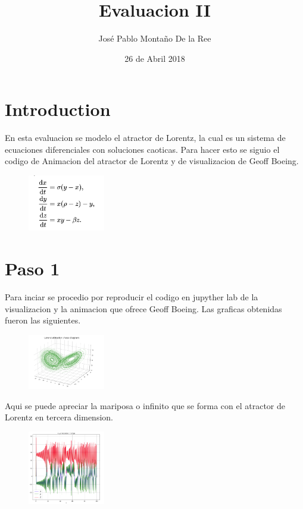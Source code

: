\documentclass[a4paper]{article}
\title{Evaluacion II}
\author{José Pablo Montaño De la Ree}
\date{26 de Abril 2018}
\begin{document}
\maketitle


\section{Introduction}

En esta evaluacion se modelo el atractor de Lorentz, la cual es un sistema de ecuaciones diferenciales con soluciones caoticas. Para hacer esto se siguio el codigo de Animacion del atractor de Lorentz y de visualizacion de Geoff Boeing. 

\begin{figure}[ht!]
\centering
\includegraphics[width=0.3\textwidth]{K.png}
\caption{\label{fig:}}
\end{figure}

\section{Paso 1}

Para inciar se procedio por reproducir el codigo en jupyther lab de la visualizacion y la animacion que ofrece Geoff Boeing. Las graficas obtenidas fueron las siguientes.

\begin{figure}[ht!]
\centering
\includegraphics[width=0.3\textwidth]{A1.png}
\caption{\label{fig:}}
\end{figure}

Aqui se puede apreciar la mariposa o infinito que se forma con el atractor de Lorentz en tercera dimension.
\newpage

\begin{figure}[ht!]
\centering
\includegraphics[width=0.3\textwidth]{B1.png}
\caption{\label{fig:}}
\end{figure}
\end{document}

